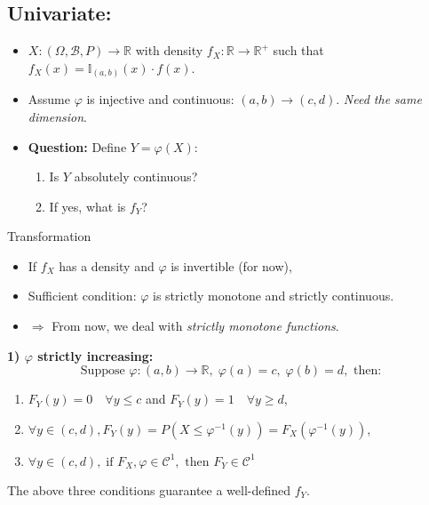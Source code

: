 \subsection{Univariate:}
\begin{itemize}
    \item \( X : (\Omega, \mathscr{B}, P) \to \mathbb{R} \) with density \( f_X : \mathbb{R} \to \mathbb{R}^+ \) such that \( f_X(x) = \mathbb{I}_{(a,b)}(x) \cdot f(x) \).
    \item Assume \(\varphi\) is injective and continuous: \((a, b) \to (c, d)\). \textit{Need the same dimension}.
    \item \textbf{Question:} Define \( Y = \varphi(X) \):
    \begin{enumerate}
        \item Is \( Y \) absolutely continuous?
        \item If yes, what is \( f_Y \)?
    \end{enumerate}
\end{itemize}


\begin{thm}{Transformation}
\begin{itemize}
    \item If \( f_X \) has a density and \(\varphi\) is invertible (for now),
    \item Sufficient condition: \(\varphi\) is strictly monotone and strictly continuous.
    \item \(\Rightarrow\) From now, we deal with \textit{strictly monotone functions}.
\end{itemize}	
\end{thm}



\textbf{1) \(\varphi\) strictly increasing:}
\[
\text{Suppose } \varphi : (a, b) \to \mathbb{R}, \; \varphi(a) = c, \; \varphi(b) = d, \text{ then:}
\]
\begin{enumerate}
    \item \( F_Y(y) = 0 \quad \forall y \leq c \) and \( F_Y(y) = 1 \quad \forall y \geq d \),
    \item \( \forall y \in (c, d), F_Y(y) = P(X \leq \varphi^{-1}(y)) = F_X(\varphi^{-1}(y)) \),
    \item \( \forall y \in (c, d), \; \text{if } F_X, \varphi \in \mathscr{C}^1, \text{ then } F_Y \in \mathscr{C}^1 \quad \)
\end{enumerate}

The above three conditions guarantee a well-defined $f_Y$. 


